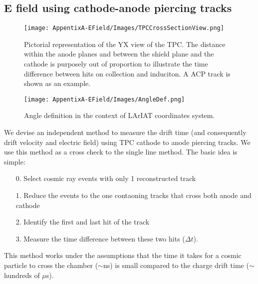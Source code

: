 \subsection*{E field using cathode-anode piercing tracks}
\begin{figure}[b]
\centering
\begin{minipage}{0.45\textwidth}
\centering
\texttt{[image: AppentixA-EField/Images/TPCCrossSectionView.png]}
\caption{Pictorial representation of the YX view of the TPC. The distance within the anode planes and between the shield plane and the cathode is purposely out of proportion to illustrate the time difference between hits on collection and induciton. A ACP track is shown as an example.}
\label{fig:Scheme}
\end{minipage}\hfill
\begin{minipage}{0.45\textwidth}
\centering
\texttt{[image: AppentixA-EField/Images/AngleDef.png]}
\caption{Angle definition in the context of LArIAT coordinates system.}
\label{fig:AngleDef}
\end{minipage}
\end{figure}
We devise an independent method to measure the drift time (and consequently drift velocity and electric field) using TPC cathode to anode piercing tracks. We use this method as a cross check to the single line method.
The basic idea is simple:
\begin{itemize}
\item[0.] Select cosmic ray events with only 1 reconstructed track 
\item[1.] Reduce the events to the one contaoning tracks that cross both anode and cathode
\item[2.] Identify the first and last hit of the track
\item[3.] Measure the time difference between these two hits ($\Delta t$).
\end{itemize}
This method works under the assumptions that the time it takes for a cosmic particle to cross the chamber ($\sim$ns) is small compared to the charge drift time ($\sim$ hundreds of $\mu$s).

